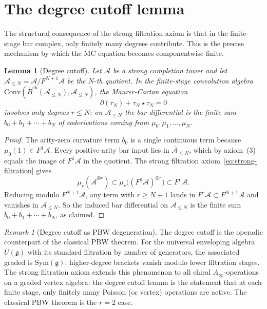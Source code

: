 \documentclass[11pt,reqno]{amsart}
\newtheorem{lemma}[theorem]{Lemma}
\theoremstyle{definition}
\theoremstyle{remark}
\newtheorem{remark}[theorem]{Remark}
\newcommand{\cA}{\mathcal{A}}
\newcommand{\barB}{\overline{B}}
\newcommand{\fg}{\mathfrak{g}}
\newcommand{\Ainf}{A_\infty}
\newcommand{\Conv}{\mathrm{Conv}}
\numberwithin{equation}{section}
\begin{document}

\section{The degree cutoff lemma}
\label{sec:cutoff}

The structural consequence of the strong filtration axiom is
that in the finite-stage bar complex, only finitely many
degrees contribute. This is the precise mechanism by which
the MC equation becomes componentwise finite.

\begin{lemma}[Degree cutoff]
\label{lem:degree-cutoff}
Let $\cA$ be a strong completion tower and let
$\cA_{\le N} = \cA/F^{N+1}\cA$ be the $N$-th quotient. In the
finite-stage convolution algebra
$\Conv(\barB^{\mathrm{ch}}(\cA_{\le N}), \cA_{\le N})$, the
Maurer-Cartan equation
\[
\partial(\tau_N) + \tau_N \star \tau_N = 0
\]
involves only degrees $r \le N$: on $\cA_{\le N}$ the bar
differential is the finite sum $b_0+b_1+\cdots+b_N$
of coderivations coming from $\mu_0,\mu_1,\dots,\mu_N$.
\end{lemma}

\begin{proof}
The arity-zero curvature term $b_0$ is a single continuous term
because $\mu_0(1)\in F^1\cA$. Every positive-arity bar input lies
in $\overline{\cA}_{\le N}$, which by
axiom~(3) equals the image of $F^1\cA$ in the quotient. The
strong filtration axiom~\eqref{eq:strong-filtration} gives
\[
\mu_r(\overline{\cA}^{\otimes r}) \subset
\mu_r\bigl((F^1\cA)^{\otimes r}\bigr) \subset F^r\cA.
\]
Reducing modulo $F^{N+1}\cA$, any term with $r \ge N+1$ lands
in $F^r\cA \subset F^{N+1}\cA$ and vanishes in $\cA_{\le N}$.
So the induced bar differential on $\cA_{\le N}$ is the
finite sum
$b_0+b_1+\cdots+b_N$, as claimed.
\end{proof}

\begin{remark}[Degree cutoff as PBW degeneration]
The degree cutoff is the operadic counterpart of the classical
PBW theorem. For the universal enveloping algebra $U(\fg)$
with its standard filtration by number of generators, the
associated graded is $\mathrm{Sym}(\fg)$; higher-degree
brackets vanish modulo lower filtration stages. The strong
filtration axiom extends this phenomenon to all chiral
$\Ainf$-operations on a graded vertex algebra: the degree
cutoff lemma is the statement that at each finite stage,
only finitely many Poisson (or vertex) operations are
active. The classical PBW theorem is the $r = 2$ case.
\end{remark}
\end{document}
